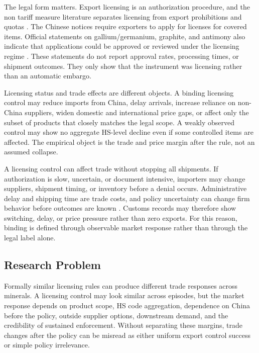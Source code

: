 \documentclass[12pt,a4paper]{article}
\numberwithin{equation}{section}
\begin{document}
The legal form matters. Export licensing is an authorization procedure, and the non tariff measure literature separates licensing from export prohibitions and quotas \citep{unctad2019ntm_classification,gamberale_tarasenko2023_export_licensing}. The Chinese notices require exporters to apply for licenses for covered items. Official statements on gallium/germanium, graphite, and antimony also indicate that applications could be approved or reviewed under the licensing regime \citep{mofcom_2023_gallium_germanium_approvals,mofcom_2024_graphite_approvals,mofcom_2024_antimony_license_review}. These statements do not report approval rates, processing times, or shipment outcomes. They only show that the instrument was licensing rather than an automatic embargo.

Licensing status and trade effects are different objects. A binding licensing control may reduce imports from China, delay arrivals, increase reliance on non-China suppliers, widen domestic and international price gaps, or affect only the subset of products that closely matches the legal scope. A weakly observed control may show no aggregate HS-level decline even if some controlled items are affected. The empirical object is the trade and price margin after the rule, not an assumed collapse.

A licensing control can affect trade without stopping all shipments. If authorization is slow, uncertain, or document intensive, importers may change suppliers, shipment timing, or inventory before a denial occurs. Administrative delay and shipping time are trade costs, and policy uncertainty can change firm behavior before outcomes are known \citep{djankov_freund_pham2010_trading_on_time,hummels_schaur2013_time_trade_barrier,handley_limao2017_policy_uncertainty}. Customs records may therefore show switching, delay, or price pressure rather than zero exports. For this reason, binding is defined through observable market response rather than through the legal label alone.

\subsection{Research Problem}

Formally similar licensing rules can produce different trade responses across minerals. A licensing control may look similar across episodes, but the market response depends on product scope, HS code aggregation, dependence on China before the policy, outside supplier options, downstream demand, and the credibility of sustained enforcement. Without separating these margins, trade changes after the policy can be misread as either uniform export control success or simple policy irrelevance.
\end{document}
